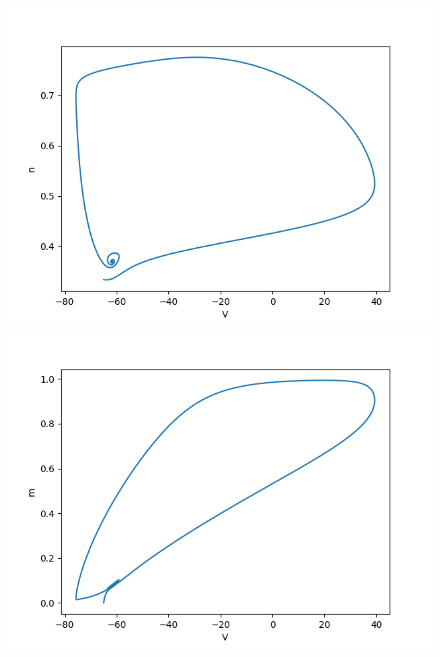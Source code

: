 \documentclass[12pt]{scrartcl}
\begin{document}
\begin{figure}[!h]
\begin{minipage}[l]{.3\linewidth}
\centering
\includegraphics[scale=0.35]{imgs/hh12.png}
    \end{minipage}\hfill
\begin{minipage}[l]{.3\linewidth}
\centering
\includegraphics[scale=0.35]{imgs/hh13.png}
    \end{minipage}\hfill
\begin{minipage}[l]{.3\linewidth}
\centering

\end{minipage}
\end{figure}
\end{document}
